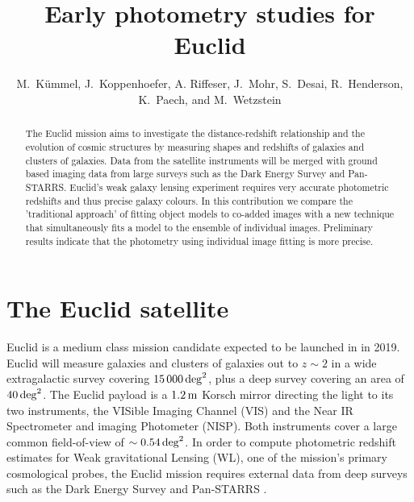 
\resetcounters




\title{Early photometry studies for Euclid}
\author{M.\ K\"ummel, J.\ Koppenhoefer, A. Riffeser, J.\ Mohr,
S.\ Desai, R.\ Henderson, K.\ Paech, and M.\ Wetzstein
}


\begin{abstract}
The Euclid mission aims to investigate the distance-redshift
relationship and the evolution of cosmic structures by measuring shapes and
redshifts of galaxies and clusters of galaxies. Data from the satellite
instruments will be merged with ground based imaging data from large
surveys such as the Dark Energy Survey and Pan-STARRS. Euclid's weak galaxy lensing
experiment requires very accurate photometric redshifts and thus precise galaxy colours.
In this contribution
we compare the 'traditional approach' of fitting object models to co-added
images with a new technique that simultaneously fits a model to the ensemble of individual
images. Preliminary results indicate that the photometry using individual
image fitting is more precise.
\end{abstract}

\section{The Euclid satellite}
Euclid \citep{2011arXiv1110.3193L} is a medium class mission candidate expected to be launched in in 2019. 
Euclid will measure galaxies
and clusters of galaxies out to $z\sim2$ in a wide extragalactic survey
covering $15\,000\,\rm{deg}^2$, plus a deep survey covering an area of $40\,\rm{deg}^2$.
The Euclid payload is a $1.2\,\rm{m}$ Korsch mirror directing the light to its two instruments,
the VISible Imaging Channel (VIS) and the Near IR Spectrometer and imaging
Photometer (NISP). Both instruments cover a large common field-of-view of $\sim0.54\,\rm{deg}^2$.
In order to compute photometric redshift estimates for Weak gravitational Lensing (WL),
one of the mission's primary cosmological probes, the Euclid mission requires external data
from deep surveys such as the Dark Energy Survey \citep[DES]{2012APS..APR.D7007F} and
Pan-STARRS \citep{2002SPIE.4836..154K}.

